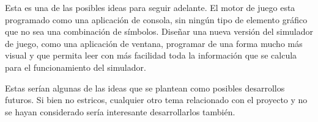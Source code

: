 Esta es una de las posibles ideas para seguir adelante. El motor de juego esta programado como una aplicación de consola, sin ningún tipo de elemento gráfico que no sea una combinación de símbolos. Diseñar una nueva versión del simulador de juego, como una aplicación de ventana, programar de una forma mucho más visual y que permita leer con más facilidad toda la información que se calcula para el funcionamiento del simulador.


Estas serían algunas de las ideas que se plantean como posibles desarrollos futuros. Si bien no estricos, cualquier otro tema relacionado con el proyecto y no se hayan considerado sería interesante desarrollarlos también.